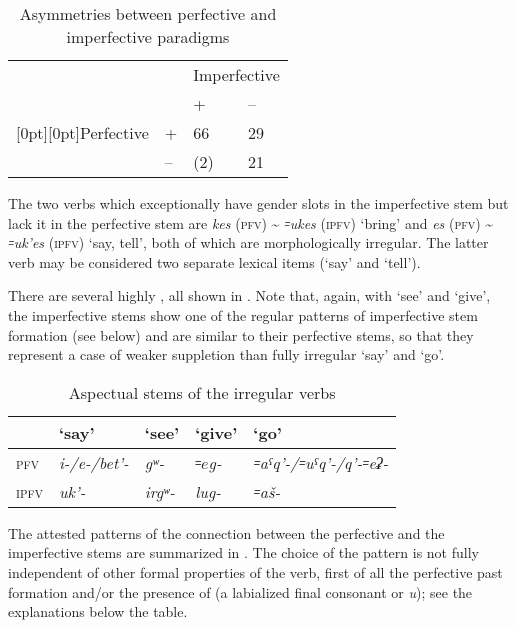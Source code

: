 \documentclass[output=paper]{langsci/langscibook}
\begin{document}
\begin{table}[h]
  \caption{Asymmetries between perfective and imperfective paradigms}

  \begin{tabular}{@{}ll*2{p{2em}<{\centering}}@{}}
    \toprule
    & & \multicolumn{2}{c}{Imperfective}\tabularnewline \cmidrule{3-4}
    & & + & – \tabularnewline \midrule 
            \raisebox{-6pt}[0pt][0pt]{Perfective} & + & 66 & 29\tabularnewline
    & – & (2) & 21\tabularnewline
                \bottomrule
  \end{tabular}
\end{table}

The two verbs which exceptionally have gender slots in the imperfective
stem but lack it in the perfective stem are \emph{kes} (\textsc{pfv})
\textasciitilde{} \emph{꞊ukes} (\textsc{ipfv}) `bring' and \emph{es} (\textsc{pfv})
\textasciitilde{} \emph{꞊uk'es} (\textsc{ipfv}) `say, tell', both of which are
morphologically irregular. The latter verb may be considered two
separate lexical items (`say' and `tell').


There are several highly , all shown in . Note
that, again, with `see' and `give', the imperfective stems show one of
the regular patterns of imperfective stem formation (see below) and are
similar to their perfective stems, so that they represent a case of
weaker suppletion than fully irregular `say' and `go'.

\vspace{-.5\baselineskip}


\begin{table}[H]
  \caption{Aspectual stems of the irregular verbs}\label{tab:4:5}

\begin{tabular}{@{}lllll@{}}
\toprule
& `say' & `see' & `give' & `go'\tabularnewline \midrule
\textsc{pfv} & \emph{i-/e-/bet'-} & \emph{gʷ-} & \emph{\(꞊e\)g-} &
\emph{꞊aˤq'-/꞊uˤq'-/q'-꞊eʡ-}\tabularnewline
\textsc{ipfv} & \emph{uk'-} & \emph{irgʷ-} & \emph{lug-} &
\emph{꞊aš-}\tabularnewline
\bottomrule
\end{tabular}
\end{table}


The attested patterns of the connection between the perfective and the
imperfective stems are summarized in . The choice of the pattern
is not fully independent of other formal properties of the verb, first
of all the perfective past formation and/or the presence of
 (a labialized final consonant or \emph{u}); see the
explanations below the table.
\end{document}
